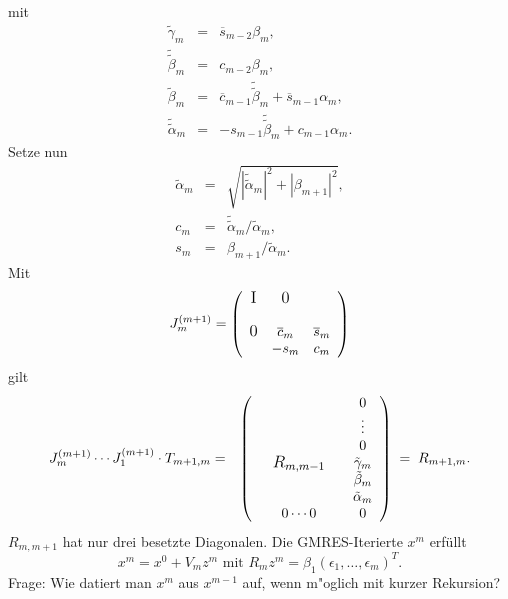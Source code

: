 mit
\begin{eqnarray*}
 \tilde \gamma_m &=& \overline{s}_{m-2} \beta_m, \\
 \tilde{\tilde{\beta}}_m &=& c_{m-2} \beta_m, \\
 \tilde \beta_m &=& \overline{c}_{m-1} \tilde {\tilde{ \beta}}_m + \overline{s}_{m-1} \alpha_m, \\
 \tilde {\tilde \alpha}_m &=& -s_{m-1} \tilde {\tilde{ \beta}}_m + c_{m-1} \alpha_m.
\end{eqnarray*}
Setze nun
\begin{eqnarray*}
  {\tilde{ \alpha}}_m &=& \sqrt{|\tilde{ \tilde \alpha}_m|^2+|\beta_{m+1}|^2}, \\
 c_m &=&  \tilde {\tilde \alpha}_m /  {\tilde{ \alpha}}_m, \\
 s_m &=& \beta_{m+1} / {\tilde {\alpha}}_m.
\end{eqnarray*}
Mit
\begin{eqnarray*}
J_m^{(m+1)} = \left(\begin{array}{ccc}
                        & & \\
                        \raisebox{12pt}[-12pt]{\large I} & \raisebox{12pt}[-12pt]{\large 0}& \\
				& \overline{c}_m & \overline{s}_m \\
\raisebox{12pt}[-12pt]{\large 0}				& -s_m & c_m
               \end{array}\right) 
\end{eqnarray*}
gilt
\begin{eqnarray*}
 J_m^{(m+1)}\cdots J_1^{(m+1)} \cdot T_{m+1,m} &=&  
\left(\begin{array}{cc}
                        & 0\\
                        & \vdots\\
				& 0 \\
				& \tilde \gamma_m \\
\quad                        \raisebox{12pt}[-12pt]{\large $R_{m,m-1}$}\quad & \tilde \beta_m \\
				&  {\tilde {\alpha}}_m \\
				0 \cdots 0 & 0
               \end{array}\right) \; = \; R_{m+1,m}.
\end{eqnarray*}
$R_{m,m+1}$ hat nur drei besetzte Diagonalen.
Die GMRES-Iterierte $x^m$ erf\"ullt
$$ x^m = x^0 + V_m z^m \text{ mit } R_m z^m=\beta_1 (\epsilon_1,\ldots,\epsilon_m)^T .$$
Frage: Wie datiert man $x^m$ aus $x^{m-1}$ auf, wenn m"oglich mit kurzer Rekursion?

